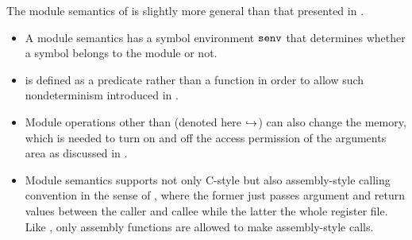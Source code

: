 The module semantics of \ccm{} is slightly more general than that presented in .
\begin{itemize}
\item A module semantics has a symbol environment $\texttt{senv}$ that determines whether a symbol belongs to the module or not.
\item {} is defined as a predicate rather than a function in order to allow such nondeterminism introduced in .
\item Module operations other than  (denoted here $\stackrel{}{\hookrightarrow}$) can also change the
  memory, which is needed to turn on and off the access permission of the arguments area as discussed in .
\item Module semantics supports not only C-style but also assembly-style calling convention in the sense of \ccx{},
  where the former just passes argument and return values between the caller and callee while the latter the whole register file.
  Like \ccx{}, only assembly functions are allowed to make assembly-style calls.
\end{itemize}

